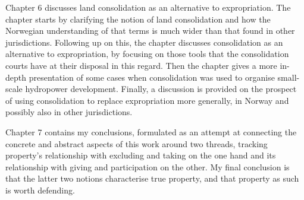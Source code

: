 Chapter 6 discusses land consolidation as an alternative to expropriation. The chapter starts by clarifying the notion of land consolidation and how the Norwegian understanding of that terms is much wider than that found in other jurisdictions. Following up on this, the chapter discusses consolidation as an alternative to expropriation, by focusing on those tools that the consolidation courts have at their disposal in this regard. Then the chapter gives a more in-depth presentation of some cases when consolidation was used to organise small-scale hydropower development. Finally, a discussion is provided on the prospect of using consolidation to replace expropriation more generally, in Norway and possibly also in other jurisdictions.

Chapter 7 contains my conclusions, formulated as an attempt at connecting the concrete and abstract aspects of this work around two threads, tracking property's relationship with excluding and taking on the one hand and its relationship with giving and participation on the other. My final conclusion is that the latter two notions characterise true property, and that property as such is worth defending.